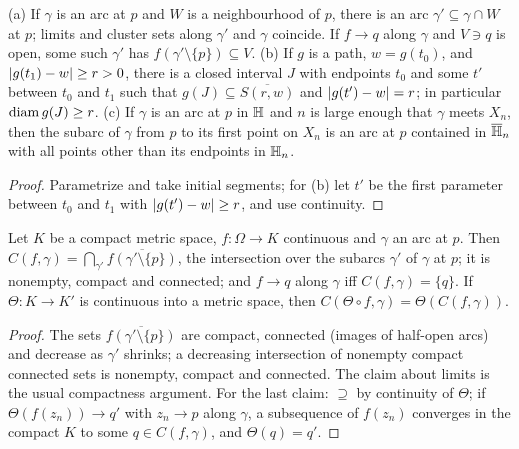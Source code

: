 \begin{lemma}\label{lem:subarc}
(a) If $\gamma$ is an arc at $p$ and $W$ is a neighbourhood of $p$, there is an arc $\gamma'\subseteq\gamma\cap
W$ at $p$; limits and cluster sets along $\gamma'$ and $\gamma$ coincide. If $f\to q$ along $\gamma$ and
$V\ni q$ is open, some such $\gamma'$ has $f(\gamma'\setminus\{p\})\subseteq V$.
(b) If $g$ is a path, $w=g(t_0)$, and $\lvert g(t_1)-w\rvert\ge r>0$, there is a closed interval $J$ with
endpoints $t_0$ and some $t'$ between $t_0$ and $t_1$ such that $g(J)\subseteq\overline{S(r,w)}$ and
$\lvert g(t')-w\rvert=r$; in particular $\operatorname{diam} g(J)\ge r$.
(c) If $\gamma$ is an arc at $p$ in $\mathbb{H}$ and $n$ is large enough that $\gamma$ meets $X_n$, then the subarc
of $\gamma$ from $p$ to its first point on $X_n$ is an arc at $p$ contained in $\overline{\mathbb{H}}_n$ with all
points other than its endpoints in $\mathbb{H}_n$.
\end{lemma}
\begin{proof}
Parametrize and take initial segments; for (b) let $t'$ be the first parameter between $t_0$ and $t_1$
with $\lvert g(t')-w\rvert\ge r$, and use continuity.
\end{proof}

\begin{lemma}\label{lem:cluster}
Let $K$ be a compact metric space, $f:\Omega\to K$ continuous and $\gamma$ an arc at $p$. Then
$C(f,\gamma)=\bigcap_{\gamma'}\overline{f(\gamma'\setminus\{p\})}$, the intersection over the subarcs
$\gamma'$ of $\gamma$ at $p$; it is nonempty, compact and connected; and $f\to q$ along $\gamma$ iff
$C(f,\gamma)=\{q\}$. If $\Theta:K\to K'$ is continuous into a metric space, then
$C(\Theta\circ f,\gamma)=\Theta(C(f,\gamma))$.
\end{lemma}
\begin{proof}
The sets $\overline{f(\gamma'\setminus\{p\})}$ are compact, connected (images of half-open arcs) and
decrease as $\gamma'$ shrinks; a decreasing intersection of nonempty compact connected sets is
nonempty, compact and connected. The claim about limits is the usual compactness argument. For the last
claim: $\supseteq$ by continuity of $\Theta$; if $\Theta(f(z_n))\to q'$ with $z_n\to p$ along $\gamma$, a subsequence
of $f(z_n)$ converges in the compact $K$ to some $q\in C(f,\gamma)$, and $\Theta(q)=q'$.
\end{proof}


